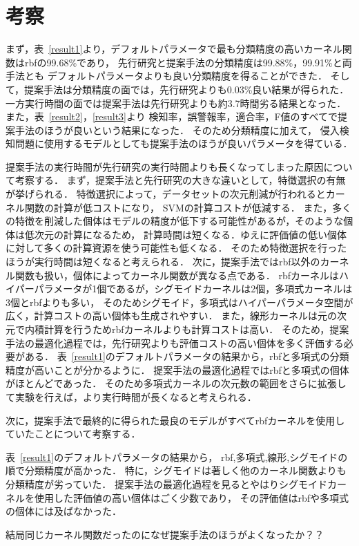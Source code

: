 \section{考察}
まず，表~\ref{result1}より，デフォルトパラメータで最も分類精度の高いカーネル関数はrbfの99.68\%であり，
先行研究と提案手法の分類精度は99.88\%，99.91\%と両手法とも
デフォルトパラメータよりも良い分類精度を得ることができた．
そして，提案手法は分類精度の面では，先行研究よりも0.03\%良い結果が得られた．
一方実行時間の面では提案手法は先行研究よりも約3.7時間劣る結果となった．
また，表~\ref{result2}，\ref{result3}より
検知率，誤警報率，適合率，F値のすべてで提案手法のほうが良いという結果になった．
そのため分類精度に加えて，
侵入検知問題に使用するモデルとしても提案手法のほうが良いパラメータを得ている．

提案手法の実行時間が先行研究の実行時間よりも長くなってしまった原因について考察する．
まず，提案手法と先行研究の大きな違いとして，特徴選択の有無が挙げられる．
特徴選択によって，データセットの次元削減が行われるとカーネル関数の計算が低コストになり，
SVMの計算コストが低減する．
また，多くの特徴を削減した個体はモデルの精度が低下する可能性があるが，そのような個体は低次元の計算になるため，
計算時間は短くなる．ゆえに評価値の低い個体に対して多くの計算資源を使う可能性も低くなる．
そのため特徴選択を行ったほうが実行時間は短くなると考えられる．
次に，提案手法ではrbf以外のカーネル関数も扱い，個体によってカーネル関数が異なる点である．
rbfカーネルはハイパーパラメータが1個であるが，シグモイドカーネルは2個，多項式カーネルは3個とrbfよりも多い，
そのためシグモイド，多項式はハイパーパラメータ空間が広く，計算コストの高い個体も生成されやすい．
また，線形カーネルは元の次元で内積計算を行うためrbfカーネルよりも計算コストは高い．
そのため，提案手法の最適化過程では，先行研究よりも評価コストの高い個体を多く評価する必要がある．
表~\ref{result1}のデフォルトパラメータの結果から，rbfと多項式の分類精度が高いことが分かるように．
提案手法の最適化過程ではrbfと多項式の個体がほとんどであった．
そのため多項式カーネルの次元数の範囲をさらに拡張して実験を行えば，より実行時間が長くなると考えられる．

次に，提案手法で最終的に得られた最良のモデルがすべてrbfカーネルを使用していたことについて考察する．

表~\ref{result1}のデフォルトパラメータの結果から，
rbf,多項式,線形,シグモイドの順で分類精度が高かった．
特に，シグモイドは著しく他のカーネル関数よりも分類精度が劣っていた．
提案手法の最適化過程を見るとやはりシグモイドカーネルを使用した評価値の高い個体はごく少数であり，
その評価値はrbfや多項式の個体には及ばなかった．

結局同じカーネル関数だったのになぜ提案手法のほうがよくなったか？？

